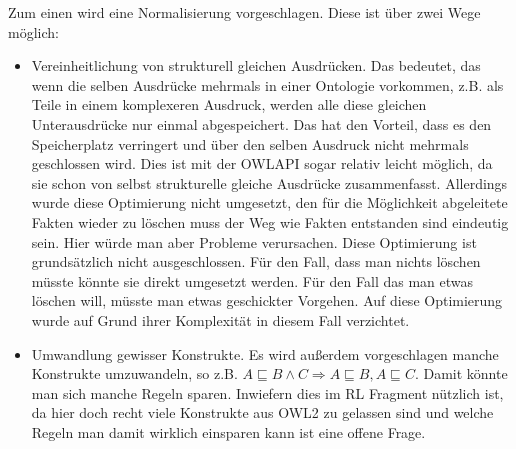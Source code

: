 Zum einen wird eine Normalisierung vorgeschlagen. Diese ist über zwei Wege möglich:
\begin{itemize}
  \item Vereinheitlichung von strukturell gleichen Ausdrücken. Das bedeutet, das wenn die selben Ausdrücke mehrmals in einer Ontologie vorkommen, z.B. als Teile in einem komplexeren Ausdruck, werden alle diese gleichen Unterausdrücke nur einmal abgespeichert. Das hat den Vorteil, dass es den Speicherplatz verringert und über den selben Ausdruck nicht mehrmals geschlossen wird. Dies ist mit der OWLAPI sogar relativ leicht möglich, da sie schon von selbst strukturelle gleiche Ausdrücke zusammenfasst. Allerdings wurde diese Optimierung nicht umgesetzt, den für die Möglichkeit abgeleitete Fakten wieder zu löschen muss der Weg wie Fakten entstanden sind eindeutig sein. Hier würde man aber Probleme verursachen. Diese Optimierung ist grundsätzlich nicht ausgeschlossen. Für den Fall, dass man nichts löschen müsste könnte sie direkt umgesetzt werden. Für den Fall das man etwas löschen will, müsste man etwas geschickter Vorgehen. Auf diese Optimierung wurde auf Grund ihrer Komplexität in diesem Fall verzichtet.
  \item Umwandlung gewisser Konstrukte. Es wird außerdem vorgeschlagen manche Konstrukte umzuwandeln, so z.B. $A \sqsubseteq B \land C \Rightarrow A \sqsubseteq B, A \sqsubseteq C$. Damit könnte man sich manche Regeln sparen. Inwiefern dies im RL Fragment nützlich ist, da hier doch recht viele Konstrukte aus OWL2 zu gelassen sind und welche Regeln man damit wirklich einsparen kann ist eine offene Frage.
\end{itemize}


